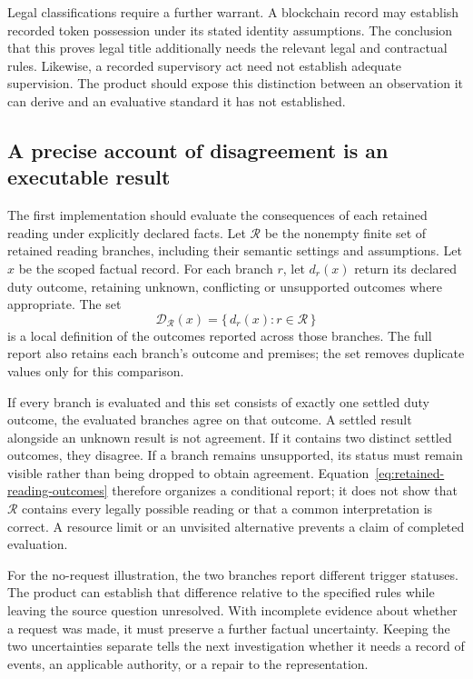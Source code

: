Legal classifications require a further warrant. A blockchain record may
establish recorded token possession under its stated identity assumptions.
The conclusion that this proves legal title additionally needs the relevant
legal and contractual rules. Likewise, a recorded supervisory act need not
establish adequate supervision. The product should expose this distinction
between an observation it can derive and an evaluative standard it has not
established.

\subsection{A precise account of disagreement is an executable result}

The first implementation should evaluate the consequences of each retained
reading under explicitly declared facts. Let \(\mathcal R\) be the nonempty
finite set of retained reading branches, including their semantic settings
and assumptions. Let \(x\) be the scoped factual record. For each branch
\(r\), let \(d_r(x)\) return its declared duty outcome, retaining unknown,
conflicting or unsupported outcomes where appropriate. The set
\begin{equation}
  \mathcal D_{\mathcal R}(x)
    = \{\,d_r(x) : r\in\mathcal R\,\}
  \label{eq:retained-reading-outcomes}
\end{equation}
is a local definition of the outcomes reported across those branches. The
full report also retains each branch's outcome and premises; the set removes
duplicate values only for this comparison.

If every branch is evaluated and this set consists of exactly one settled
duty outcome, the evaluated branches agree on that outcome. A settled result
alongside an unknown result is not agreement. If it contains two distinct
settled outcomes, they disagree. If a branch remains unsupported, its status
must remain visible rather than being dropped to obtain agreement.
Equation~\eqref{eq:retained-reading-outcomes} therefore organizes a conditional
report; it does not show that \(\mathcal R\) contains every legally possible
reading or that a common interpretation is correct. A resource limit or an
unvisited alternative prevents a claim of completed evaluation.

For the no-request illustration, the two branches report different trigger
statuses. The product can establish that difference relative to the specified
rules while leaving the source question unresolved. With incomplete evidence
about whether a request was made, it must preserve a further factual
uncertainty. Keeping the two uncertainties separate tells the next
investigation whether it needs a record of events, an applicable authority,
or a repair to the representation.

